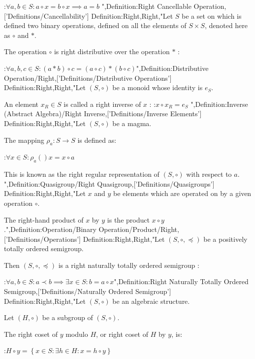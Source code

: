 :$\forall a, b \in S: a \circ x = b \circ x \implies a = b$
",Definition:Right Cancellable Operation,['Definitions/Cancellability']
Definition:Right,Right,"Let $S$ be a set on which is defined two binary operations, defined on all the elements of $S \times S$, denoted here as $\circ$ and $*$.

The operation $\circ$ is right distributive over the operation $*$ :

:$\forall a, b, c \in S: \left( a * b \right) \circ c = \left( a \circ c \right) * \left( b \circ c \right)$",Definition:Distributive Operation/Right,['Definitions/Distributive Operations']
Definition:Right,Right,"Let $\left( S, \circ \right)$ be a monoid whose identity is $e_S$.

An element $x_R \in S$ is called a right inverse of $x$ :
:$x \circ x_R = e_S$
",Definition:Inverse (Abstract Algebra)/Right Inverse,['Definitions/Inverse Elements']
Definition:Right,Right,"Let $\left( S, \circ \right)$ be a magma.

The mapping $\rho_a: S \to S$ is defined as:

:$\forall x \in S: \rho_a \left(   \right)x = x \circ a$


This is known as the right regular representation of $\left( S, \circ \right)$ with respect to $a$.
",Definition:Quasigroup/Right Quasigroup,['Definitions/Quasigroups']
Definition:Right,Right,"Let $x$ and $y$ be elements which are operated on by a given operation $\circ$.

The right-hand product of $x$ by $y$ is the product $x \circ y$.",Definition:Operation/Binary Operation/Product/Right,['Definitions/Operations']
Definition:Right,Right,"Let $\left( S, \circ, \preceq \right)$ be a positively totally ordered semigroup.


Then $\left( S, \circ, \preceq \right)$ is a right naturally totally ordered semigroup :

:$\forall a, b \in S: a \prec b \implies \exists x \in S: b = a \circ x$",Definition:Right Naturally Totally Ordered Semigroup,['Definitions/Naturally Ordered Semigroup']
Definition:Right,Right,"Let $\left( S, \circ \right)$ be an algebraic structure.

Let $\left( H, \circ \right)$ be a subgroup of $\left( S, \circ \right)$.


The right coset of $y$ modulo $H$, or right coset of $H$ by $y$, is:

:$H \circ y = \left\lbrace x \in S: \exists h \in H: x = h \circ y \right\rbrace$


